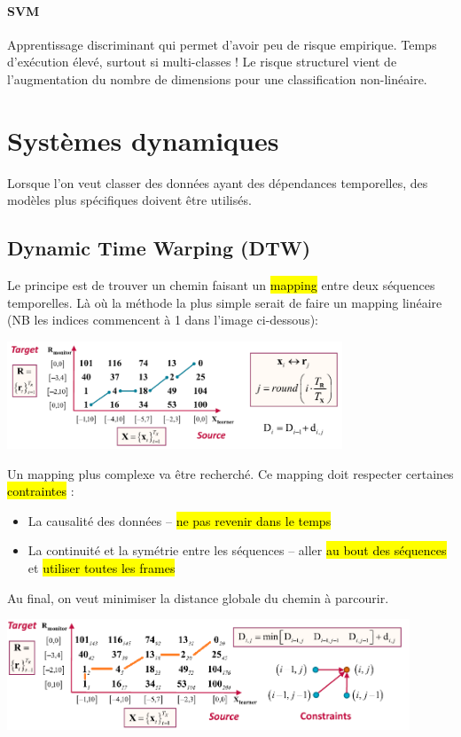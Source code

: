 \documentclass[letterpaper, 12pt]{article}
\newcommand{\alinea}{
\hspace*{0.5cm}}
\begin{document}
			\paragraph{SVM}
				\alinea Apprentissage discriminant qui permet d'avoir peu de risque empirique. Temps d'exécution élevé, surtout 
					si multi-classes ! Le risque structurel vient de l'augmentation du nombre de dimensions pour une classification
					non-linéaire.
	\section{Systèmes dynamiques}
		\alinea Lorsque l'on veut classer des données ayant des dépendances temporelles, des modèles plus spécifiques doivent être
			utilisés.
		\subsection{Dynamic Time Warping (DTW)}
			\alinea Le principe est de trouver un chemin faisant un \hl{mapping} entre deux séquences temporelles.
				Là où la méthode la plus simple serait de faire un mapping linéaire (NB les indices commencent à 1 dans l'image
				ci-dessous):
				\begin{center}
					\includegraphics[width=0.75\textwidth]{Images/dtw1}
				\end{center}
			Un mapping plus complexe va être recherché. Ce mapping doit respecter certaines \hl{contraintes} : 
				\begin{itemize}
					\setlength\itemsep{0cm}
					\item La causalité des données  -- \hl{ne pas revenir dans le temps} 
					\item La continuité et la symétrie entre les séquences -- aller \hl{au bout des séquences} et \hl{utiliser toutes les
						frames}
				\end{itemize} 
				Au final, on veut minimiser la distance globale du chemin à parcourir.
			\begin{center}
				\includegraphics[width=0.9\textwidth]{Images/dtw2}
			\end{center}
\end{document}
